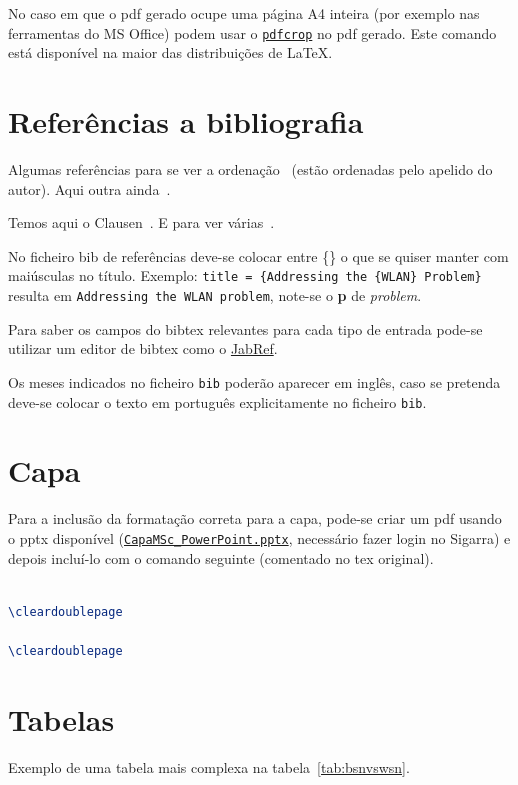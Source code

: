     No caso em que o pdf gerado ocupe uma página A4 inteira (por exemplo nas ferramentas do MS Office) podem usar o \texttt{\href{https://www.ctan.org/pkg/pdfcrop?lang=en}{pdfcrop}} no pdf gerado. Este comando está disponível na maior das distribuições de \LaTeX.


\section{Referências a bibliografia}
Algumas referências para se ver a ordenação~\cite{yaacoub2012} (estão ordenadas pelo apelido do autor). Aqui outra ainda~\cite{etsitr102732}.

Temos aqui o Clausen~\cite{Clausen2003}. E para ver várias~\cite{yaacoub2012, etsitr102732, strunk2007elements}.

No ficheiro bib de referências deve-se colocar entre \{\} o que se quiser manter com maiúsculas no título. Exemplo: \texttt{title = \{Addressing the \{WLAN\} Problem\}} resulta em \texttt{Addressing the WLAN problem}, note-se o \textbf{p} de \emph{problem}. 

Para saber os campos do bibtex relevantes para cada tipo de entrada pode-se utilizar um editor de bibtex como o \href{http://www.jabref.org}{JabRef}.

Os meses indicados no ficheiro \texttt{bib} poderão aparecer em inglês, caso se pretenda deve-se colocar o texto em português explicitamente no ficheiro \texttt{bib}.


\section{Capa}
Para a inclusão da formatação correta para a capa, pode-se criar um pdf usando o 
pptx disponível 
(\texttt{\href{https://sigarra.up.pt/fcup/pt/conteudos_service.conteudos_cont?pct_id=162960&pv_cod=19anaMgwFYkm}{CapaMSc\_PowerPoint.pptx}}, 
necessário fazer login no Sigarra) e depois incluí-lo com o comando seguinte 
(comentado no tex original).

\begin{lstlisting}[numbers=none,language=TeX,caption={[Capas tese] Incluir capas oficiais},label=lis:capasTese,float=htb]

\cleardoublepage

\cleardoublepage
\end{lstlisting}


\section{Tabelas}
Exemplo de uma tabela mais complexa na tabela~\ref{tab:bsnvswsn}.

